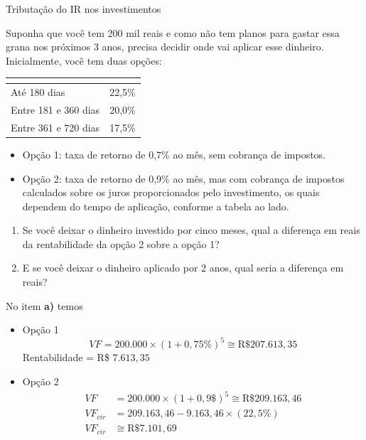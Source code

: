 \begin{example}{Tributação do IR nos investimentos}

Suponha que você tem 200 mil reais e como não tem planos para gastar essa grana nos próximos 3 anos, precisa decidir onde vai aplicar esse dinheiro. Inicialmente, você tem duas opções:

\begin{table}[H]
\centering
\begin{tabu} to \textwidth{|l|l|}
\hline
{} &  \\
\hline
Até 180 dias & 22,5\% \\
\hline
Entre 181 e 360 dias & 20,0\% \\
\hline
Entre 361 e 720 dias & 17,5\% \\
\hline
\end{tabu}
\end{table}

\begin{itemize}
\item Opção 1: taxa de retorno de 0,7\% ao mês, sem cobrança de impostos.
\item Opção 2: taxa de retorno de 0,9\% ao mês, mas com cobrança de impostos calculados sobre os juros proporcionados pelo investimento, os quais dependem do tempo de aplicação, conforme a tabela ao lado.
\end{itemize}

\begin{enumerate}
\item Se você deixar o dinheiro investido por cinco meses, qual a diferença em reais da rentabilidade da opção 2 sobre a opção 1?
\item E se você deixar o dinheiro aplicado por 2 anos, qual seria a diferença em reais?
\end{enumerate}

No item \textcolor{\currentcolor}{\textbf{a)}} temos

\begin{itemize}
  \item Opção 1
  \begin{equation*}
  VF=200.000\times(1+0{,}75\%)^5\cong \text{R\$}207.613{,}35
  \end{equation*}
  Rentabilidade = R\$ $7.613{,}35$

  \item Opção 2
  \begin{align*}
  VF&=200.000\times(1+0{,}9\$)^5\cong\text{R\$}209.163{,}46\\
  VF_{cir}&=209.163{,}46-9.163{,}46\times(22{,}5\%)\\
  VF_{cir}&\cong\text{R\$}7.101{,}69
  \end{align*}
\end{itemize}


\end{example}
